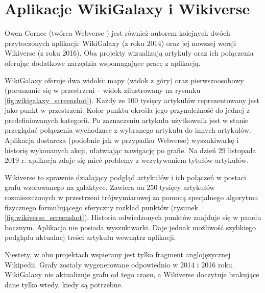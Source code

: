\section{Aplikacje WikiGalaxy i Wikiverse}

Owen Cornec (twórca Webverse \cite{Webverse}) jest również autorem kolejnych dwóch przytoczonych aplikacji: WikiGalaxy \cite{WikiGalaxy} (z roku 2014) oraz jej nowszej wersji Wikiverse\cite{Wikiverse} (z roku 2016). Oba projekty wizualizują artykuły oraz ich połączenia oferując dodatkowe narzędzia wspomagające pracę z aplikacją.

WikiGalaxy oferuje dwa widoki: mapy (widok z góry) oraz pierwszoosobowy (poruszanie się w przestrzeni – widok zilustrowany na rysunku \ref{fig:wikigalaxy_screenshot}). Każdy ze 100 tysięcy artykułów reprezentowany jest jako punkt w przestrzeni. Kolor punktu określa jego przynależność do jednej z predefiniowanych kategorii. Po zaznaczeniu artykułu użytkownik jest w stanie przeglądać połączenia wychodzące z wybranego artykułu do innych artykułów. Aplikacja dostarcza (podobnie jak w przypadku Webverse) wyszukiwarkę i historię wykonanych akcji, ułatwiając nawigację po grafie. Na dzień 29 listopada 2019 r. aplikacja zdaje się mieć problemy z wczytywaniem tytułów artykułów.


Wikiverse to sprawnie działający podgląd artykułów i ich połączeń w postaci grafu wzorowanego na galaktyce. Zawiera on 250 tysięcy artykułów rozmieszczonych w przestrzeni trójwymiarowej za pomocą specjalnego algorytmu fizycznego formułującego sferyczny rozkład punktów (rysunek \ref{fig:wikiverse_screenshot}). Historia odwiedzonych punktów znajduje się w panelu bocznym. Aplikacja nie posiada wyszukiwarki. Daje jednak możliwość szybkiego podglądu aktualnej treści artykułu wewnątrz aplikacji.

Niestety, w obu projektach wspierany jest tylko fragment anglojęzycznej Wikipedii. Grafy zostały wygenerowane odpowiednio w 2014 i 2016 roku. WikiGalaxy nie aktualizuje grafu od tego czasu, a Wikiverse doczytuje brakujące dane tylko wtedy, kiedy są potrzebne.

